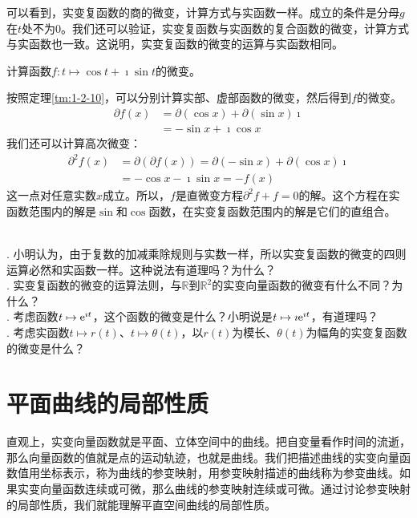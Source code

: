 \documentclass[12pt,UTF8,fontset=none]{ctexbook}
\begin{document}
可以看到，实变复函数的商的微变，计算方式与实函数一样。成立的条件是分母$g$在$t$处不为$0$。我们还可以验证，实变复函数与实函数的复合函数的微变，计算方式与实函数也一致。这说明，实变复函数的微变的运算与实函数相同。

\begin{et}
    计算函数$f: t\mapsto \cos{t} + \imath \sin{t}$的微变。
\end{et}

\begin{so}
    按照定理\ref{tm:1-2-10}，可以分别计算实部、虚部函数的微变，然后得到$f$的微变。
    \begin{align*}
        \partial f(x) &= \partial (\cos{x}) + \partial (\sin{x}) \imath \\
        &= -\sin{x} + \imath \cos{x}
    \end{align*}
    我们还可以计算高次微变：
    \begin{align*}
        \partial^2 f(x) &= \partial (\partial f(x)) = \partial (-\sin{x}) + \partial (\cos{x}) \imath \\
        &= -\cos{x} - \imath \sin{x} = -f(x)
    \end{align*}
    这一点对任意实数$x$成立。所以，$f$是直微变方程$\partial^2 f + f = 0$的解。这个方程在实函数范围内的解是$\sin$和$\cos$函数，在实变复函数范围内的解是它们的直组合。
\end{so}

\begin{sk}
    \mbox{}\\
    . 小明认为，由于复数的加减乘除规则与实数一样，所以实变复函数的微变的四则运算必然和实函数一样。这种说法有道理吗？为什么？\\
    . 实变复函数的微变的运算法则，与$\mathbb{R}$到$\mathbb{R}^2$的实变向量函数的微变有什么不同？为什么？\\
    . 考虑函数$t \mapsto \mathrm{e}^{\imath t}$，这个函数的微变是什么？小明说是$t \mapsto \imath \mathrm{e}^{\imath t}$，有道理吗？\\
    . 考虑实函数$t \mapsto r(t)$、$t \mapsto \theta(t)$，以$r(t)$为模长、$\theta(t)$为幅角的实变复函数的微变是什么？
\end{sk}

\section{平面曲线的局部性质}

直观上，实变向量函数就是平面、立体空间中的曲线。把自变量看作时间的流逝，那么向量函数的值就是点的运动轨迹，也就是曲线。我们把描述曲线的实变向量函数值用坐标表示，称为曲线的参变映射，用参变映射描述的曲线称为参变曲线。如果实变向量函数连续或可微，那么曲线的参变映射连续或可微。通过讨论参变映射的局部性质，我们就能理解平直空间曲线的局部性质。
\end{document}

